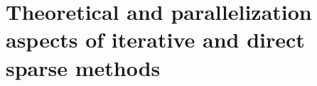 \chapter{Theoretical and parallelization aspects of iterative and direct sparse methods}\label{subseq:theory-of-iterative-and-direct-methods}






